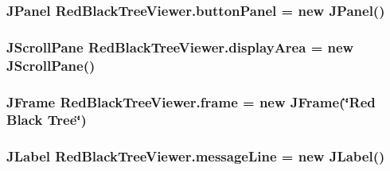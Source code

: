 \subsubsection[{\texorpdfstring{button\+Panel}{buttonPanel}}]{\setlength{\rightskip}{0pt plus 5cm}J\+Panel Red\+Black\+Tree\+Viewer.\+button\+Panel = new J\+Panel()\hspace{0.3cm}{\ttfamily [package]}}\hypertarget{class_red_black_tree_viewer_ae4a99fc6ea87e0a02d1d92c1b95ff6fb}{}\label{class_red_black_tree_viewer_ae4a99fc6ea87e0a02d1d92c1b95ff6fb}
\subsubsection[{\texorpdfstring{display\+Area}{displayArea}}]{\setlength{\rightskip}{0pt plus 5cm}J\+Scroll\+Pane Red\+Black\+Tree\+Viewer.\+display\+Area = new J\+Scroll\+Pane()\hspace{0.3cm}{\ttfamily [package]}}\hypertarget{class_red_black_tree_viewer_a29e143bcfef5a1feb59fdc7bc85e4ca0}{}\label{class_red_black_tree_viewer_a29e143bcfef5a1feb59fdc7bc85e4ca0}
\subsubsection[{\texorpdfstring{frame}{frame}}]{\setlength{\rightskip}{0pt plus 5cm}J\+Frame Red\+Black\+Tree\+Viewer.\+frame = new J\+Frame(\char`\"{}Red Black Tree\char`\"{})\hspace{0.3cm}{\ttfamily [package]}}\hypertarget{class_red_black_tree_viewer_a63b608eef30c345e86fbf565296da751}{}\label{class_red_black_tree_viewer_a63b608eef30c345e86fbf565296da751}
\subsubsection[{\texorpdfstring{message\+Line}{messageLine}}]{\setlength{\rightskip}{0pt plus 5cm}J\+Label Red\+Black\+Tree\+Viewer.\+message\+Line = new J\+Label()\hspace{0.3cm}{\ttfamily [package]}}\hypertarget{class_red_black_tree_viewer_accf947ca330f1d4dd258e233ea275d58}{}\label{class_red_black_tree_viewer_accf947ca330f1d4dd258e233ea275d58}
